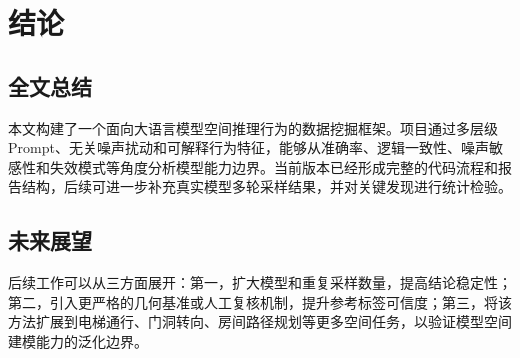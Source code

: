 
\chapter{结\quad 论}

\section{全文总结}

本文构建了一个面向大语言模型空间推理行为的数据挖掘框架。项目通过多层级 Prompt、无关噪声扰动和可解释行为特征，能够从准确率、逻辑一致性、噪声敏感性和失效模式等角度分析模型能力边界。当前版本已经形成完整的代码流程和报告结构，后续可进一步补充真实模型多轮采样结果，并对关键发现进行统计检验。

\section{未来展望}

后续工作可以从三方面展开：第一，扩大模型和重复采样数量，提高结论稳定性；第二，引入更严格的几何基准或人工复核机制，提升参考标签可信度；第三，将该方法扩展到电梯通行、门洞转向、房间路径规划等更多空间任务，以验证模型空间建模能力的泛化边界。
